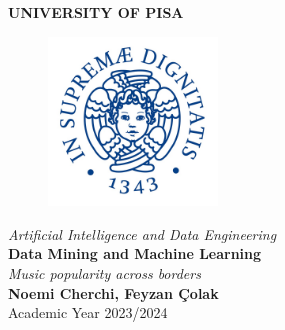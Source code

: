 \begin{titlepage}
    \centering
    \vspace*{\fill}
    {\LARGE \textbf{UNIVERSITY OF PISA}}\\[0.5cm]
    \begin{figure}[h]
        \centering
        \includegraphics[width=0.4\textwidth]{media/university-of-Pisa-logo.jpg}
    \end{figure}
    {\Large \textit{Artificial Intelligence and Data Engineering}}\\[1.5cm]
    {\LARGE \textbf{Data Mining and Machine Learning}}\\[1cm]
    {\Large \textit{Music popularity across borders}}\\[2cm]
    
    {\large \textbf{Noemi Cherchi, Feyzan Çolak}}\\[0.5cm]
    {\large Academic Year 2023/2024}
    \vspace*{\fill}
\end{titlepage}